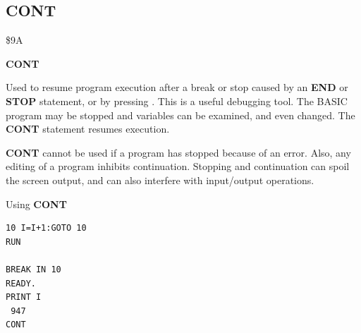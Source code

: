 \subsection{CONT}
\begin{description}[leftmargin=2cm,style=nextline]
\item [Token:] \$9A
\item [Format:] {\bf CONT}
\item [Usage:] Used to resume
               program execution after a break or stop caused by
               an {\bf END} or {\bf STOP} statement, or by pressing
               .
               This is a useful debugging tool. The BASIC program may be stopped
               and variables can be examined, and even changed.
               The {\bf CONT} statement resumes execution.
\item [Remarks:] {\bf CONT} cannot be used if a program has stopped because
               of an error. Also, any editing of a program
               inhibits continuation. Stopping and continuation
               can spoil the screen output, and can also interfere with
               input/output operations.
\item [Example:] Using {\bf CONT}
\begin{tcolorbox}[colback=black,coltext=white]
\verbatimfont{\codefont}
\begin{verbatim}
10 I=I+1:GOTO 10
RUN

BREAK IN 10
READY.
PRINT I
 947
CONT
\end{verbatim}
\end{tcolorbox}
\end{description}


\newpage
